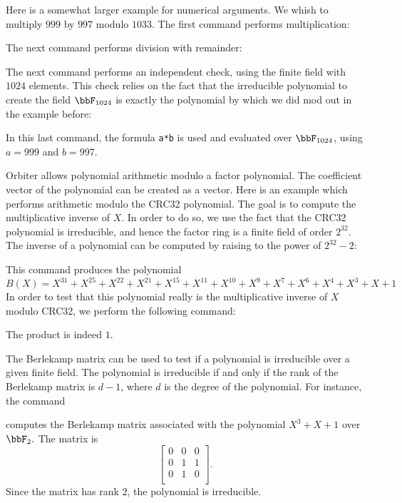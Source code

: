 \bigskip

Here is a somewhat larger example for numerical arguments. 
We whish to multiply $999$ by $997$ modulo $1033$. 
The first command performs multiplication: 
{\tt

}
The next command performs division with remainder:
{\tt

}
The next command performs an independent check, using the finite field with $1024$ elements. 
This check relies on the fact that the irreducible polynomial to create the field 
$\bbF_{1024}$ is exactly the polynomial by which we did mod out in the example before:
{\tt

}
In this last command, the formula \verb'a*b' is used and evaluated over 
$\bbF_{1024}$, using  $a=999$ and $b=997$.


\bigskip

Orbiter allows polynomial arithmetic modulo a factor polynomial.
The coefficient vector of the polynomial can be created as a vector.
Here is an example which performs arithmetic modulo the CRC32 polynomial. 
The goal is to compute the multiplicative inverse of $X$. In order to do so, 
we use the fact that the CRC32 polynomial is irreducible, and hence the factor ring is a finite field 
of order $2^{32}.$ The inverse of a polynomial can be computed by raising to the 
power of $2^{32}-2$:
{\tt

}
{\tt

}
{\tt

}
This command produces the polynomial 
$$
B(X)=X^{31} + X^{25} + X^{22} + X^{21} + X^{15} + X^{11} + X^{10} + X^{9} + X^{7} + X^{6} + X^{4} + X^{3} + X + 1
$$
In order to test that this polynomial really is the multiplicative inverse of $X$ modulo CRC32, 
we perform the following command:
{\tt

}
{\tt

}
The product is indeed $1$.


\bigskip




The Berlekamp matrix can be used to test if 
a polynomial is irreducible over a given finite field.
The polynomial is irreducible if and only if the rank of 
the Berlekamp matrix is $d-1$, where $d$ is the degree of the polynomial.
For instance, the command
{\tt

}
computes the Berlekamp matrix associated with the polynomial $X^3+X+1$ over $\bbF_2.$ 
The matrix is 
$$
\left[
\begin{array}{ccc}
0 &0 &0\\ 
0 &1 &1 \\
0 &1 &0 \\
\end{array}
\right].
$$
Since the matrix has rank $2$, the polynomial is irreducible.

